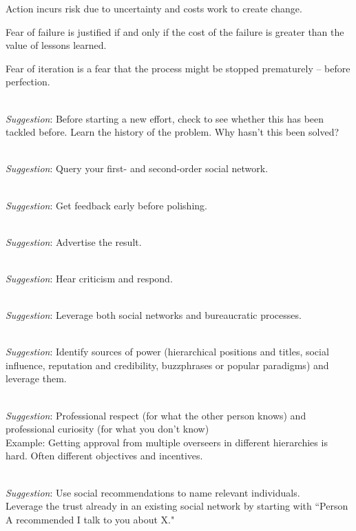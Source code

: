 Action incurs risk due to uncertainty and costs work to create change.

Fear of failure is justified if and only if the cost of the failure is greater than the value of lessons learned.

Fear of iteration is a fear that the process might be stopped prematurely -- before perfection.

\ \\
\textit{Suggestion}: Before starting a new effort, check to see whether this has been tackled before.
Learn the history of the problem. Why hasn't this been solved?

\ \\
\textit{Suggestion}: Query your first- and second-order social network.

\ \\
\textit{Suggestion}: Get feedback early before polishing.

\ \\
\textit{Suggestion}: Advertise the result.

\ \\
\textit{Suggestion}: Hear criticism and respond.

\ \\
\textit{Suggestion}: Leverage both social networks and bureaucratic processes. 

\ \\
\textit{Suggestion}: Identify sources of power (hierarchical positions and titles, social influence, reputation and credibility, buzzphrases or popular paradigms) and leverage them.

\ \\
\textit{Suggestion}: Professional respect (for what the other person knows) and professional curiosity (for what you don't know) \\
Example: Getting approval from multiple overseers in different hierarchies is hard. Often different objectives and incentives.


\ \\
\textit{Suggestion}: Use social recommendations to name relevant individuals.\\
Leverage the trust already in an existing social network by starting with ``Person A recommended I talk to you about X."


